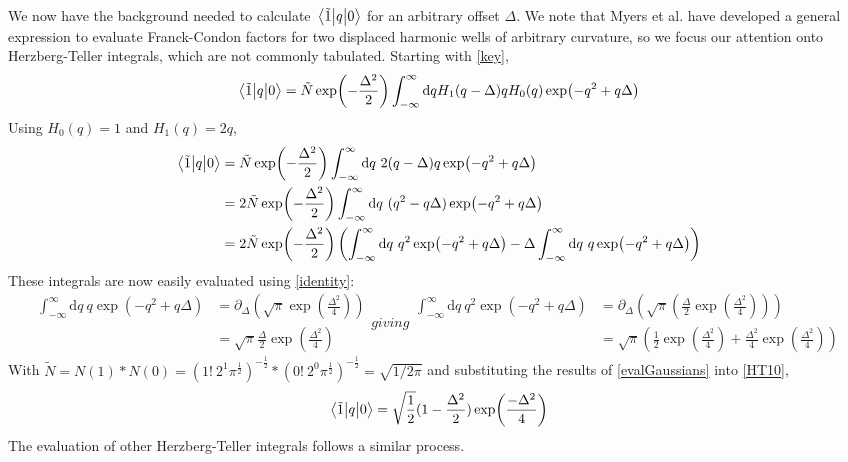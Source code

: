 \documentclass[aip, jcp, reprint, onecolumn, nofootinbib]{revtex4-2}
\begin{document}
We now have the background needed to calculate $\mel{\tilde{1}}{q}{0}$ for an arbitrary offset $\Delta$.
We note that Myers et al. have developed a general expression to evaluate Franck-Condon factors for two displaced harmonic wells of arbitrary curvature,\cite{Myers1982} so we focus our attention onto Herzberg-Teller integrals, which are not commonly tabulated.
Starting with \autoref{key},
\begin{equation}
\begin{split}
	\mel{\tilde{1}}{q}{0} = \tilde{N} \exp(-\frac{\Delta^2}{2}) \int_{-\infty}^\infty \mathrm{d}q H_1(q-\Delta) q H_0(q) \exp(-q^2 + q\Delta)
\end{split}
\end{equation}
Using $H_0(q) = 1$ and $H_1(q) = 2q$,
\begin{equation}\label{HT10}
	\begin{split}
		\mel{\tilde{1}}{q}{0} &= \tilde{N} \exp(-\frac{\Delta^2}{2}) \int_{-\infty}^\infty \mathrm{d}q \ 2(q - \Delta) q \exp(-q^2 + q\Delta)\\
		&= 2\tilde{N} \exp(-\frac{\Delta^2}{2}) \int_{-\infty}^\infty \mathrm{d}q \ (q^2 - q \Delta) \exp(-q^2 + q\Delta)\\
		&=  2\tilde{N} \exp(-\frac{\Delta^2}{2}) \left(\int_{-\infty}^\infty \mathrm{d}q \ q^2 \exp(-q^2 + q\Delta) - \Delta \int_{-\infty}^\infty \mathrm{d}q \ q \exp(-q^2 + q\Delta) \right)
	\end{split}
\end{equation}
These integrals are now easily evaluated using \autoref{identity}:
\begin{subequations}\label{evalGaussians}
	\begin{equation}
		\begin{split}
					\int_{-\infty}^\infty \mathrm{d}q \ q \exp(-q^2 + q\Delta) &= \partial_{\Delta} \left(\sqrt{\pi} \exp(\frac{\Delta^2}{4})\right)\\
					& = \sqrt{\pi} \frac{\Delta}{2} \exp(\frac{\Delta^2}{4})
		\end{split}
	\end{equation}
giving
\begin{equation}
	\begin{split}
		\int_{-\infty}^\infty \mathrm{d}q \ q^2 \exp(-q^2 + q\Delta) &= \partial_{\Delta} \left(\sqrt{\pi} \left(\frac{\Delta}{2} \exp(\frac{\Delta^2}{4})\right)\right)\\
		& =\sqrt{\pi} \left(\frac{1}{2}\exp(\frac{\Delta^2}{4}) + \frac{\Delta^2}{4} \exp(\frac{\Delta^2}{4})\right)
	\end{split}
\end{equation}
\end{subequations}
With $\tilde{N} = N(1)*N(0) = (1! \ 2^1 \pi^{\frac{1}{2}})^{-\frac{1}{2}} * (0! \ 2^0 \pi^{\frac{1}{2}})^{-\frac{1}{2}} = \sqrt{1/2\pi}$ and substituting the results of \autoref{evalGaussians} into \autoref{HT10}, 
\begin{equation}
	\mel{\tilde{1}}{q}{0} = \sqrt{\frac{1}{2}} (1 - \frac{\Delta^2}{2}) \exp(\frac{-\Delta^2}{4})
\end{equation}
The evaluation of other Herzberg-Teller integrals follows a similar process. 
\end{document}
